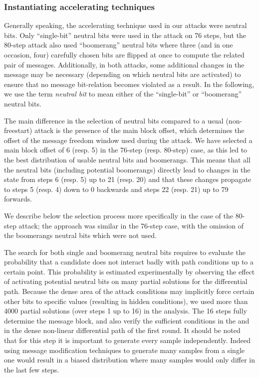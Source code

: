 \subsubsection{Instantiating accelerating techniques}
\label{sec:free_nb}

Generally speaking, the accelerating technique used in our attacks were neutral bits. Only ``single-bit'' neutral bits were used in the attack on 76 steps, but
the 80-step attack also used ``boomerang'' neutral bits where three (and in one occasion, four) carefully chosen bits are flipped at once to compute the related
pair of messages. Additionally, in both attacks, some additional changes in the message may be necessary (depending on which neutral bits are activated)
to ensure that no message bit-relation becomes violated as a result. In the following, we use the term \emph{neutral bit} to mean either of the ``single-bit''
or ``boomerang'' neutral bits.

The main difference in the selection of neutral bits compared to a usual (non-freestart) attack is the presence of the main block offset, which
determines the offset of the message freedom window used during the attack.
We have selected a main block offset of 6 (resp. 5) in the 76-step (resp. 80-step) case, as this led to the best distribution of usable neutral bits and boomerangs.
This means that all the neutral bits (including potential boomerangs) directly lead to changes in the state from steps 6 (resp. 5) up to 21 (resp. 20) and that these changes propagate to steps 5 (resp. 4) down to 0 backwards and steps
22 (resp. 21) up to 79 forwards.

We describe below the selection process more specifically in the case of the 80-step attack; the approach was similar in the 76-step case, with the omission of the boomerangs neutral bits which were not used.

\medskip

The search for both single and boomerang neutral bits requires to evaluate the probability that a candidate does not interact badly with path conditions up to a certain point.
This probability is estimated experimentally by observing the effect of activating potential neutral bits on many partial solutions for the differential path.
Because the dense area of the attack conditions may implicitly force certain other bits to specific values (resulting in hidden conditions),
we used more than 4000 partial solutions (over steps 1 up to 16) in the analysis.
The 16 steps fully determine the message block, and also verify the sufficient conditions in the \iv and in the dense non-linear differential path of the first round.
It should be noted that for this step it is important to generate every sample independently.
Indeed using \eg{} message modification techniques to generate many samples from a single one would result in a biased distribution where many samples would only differ in the last few steps.

